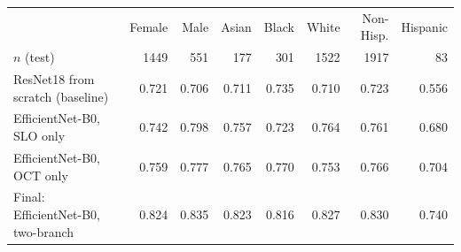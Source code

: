 \begin{tabular}{lrrrrrrr}
\toprule
 & Female & Male & Asian & Black & White & Non-Hisp. & Hispanic \\
$n$ (test) & 1449 & 551 & 177 & 301 & 1522 & 1917 & 83 \\
\midrule
ResNet18 from scratch (baseline) & 0.721 & 0.706 & 0.711 & 0.735 & 0.710 & 0.723 & 0.556 \\
EfficientNet-B0, SLO only & 0.742 & 0.798 & 0.757 & 0.723 & 0.764 & 0.761 & 0.680 \\
EfficientNet-B0, OCT only & 0.759 & 0.777 & 0.765 & 0.770 & 0.753 & 0.766 & 0.704 \\
Final: EfficientNet-B0, two-branch & 0.824 & 0.835 & 0.823 & 0.816 & 0.827 & 0.830 & 0.740 \\
\bottomrule
\end{tabular}
